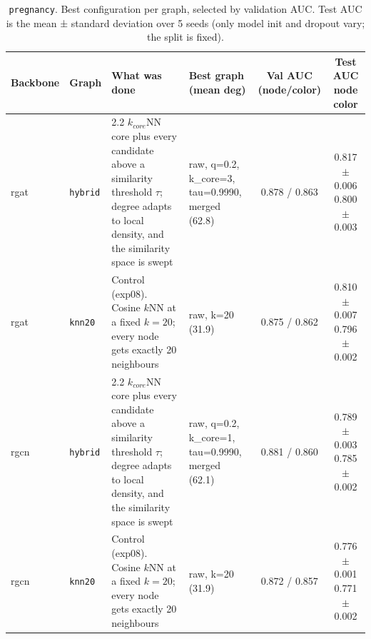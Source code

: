 \begin{table}[t]
\centering
\small
\begin{tabularx}{\textwidth}{llXlcc}
\toprule
Backbone & Graph & What was done & \makecell{Best graph\\(mean deg)} & \makecell{Val AUC\\(node/color)} & \makecell{Test AUC\\node\\color} \\
\midrule
rgat & \texttt{hybrid} & 2.2 $k_{core}$NN core plus every candidate above a similarity threshold $\tau$; degree adapts to local density, and the similarity space is swept & raw, q=0.2, k\_core=3, tau=0.9990, merged (62.8) & 0.878 / 0.863 & \makecell{0.817 $\pm$ 0.006\\0.800 $\pm$ 0.003} \\
rgat & \texttt{knn20} & Control (exp08). Cosine $k$NN at a fixed $k=20$; every node gets exactly 20 neighbours & raw, k=20 (31.9) & 0.875 / 0.862 & \makecell{0.810 $\pm$ 0.007\\0.796 $\pm$ 0.002} \\
rgcn & \texttt{hybrid} & 2.2 $k_{core}$NN core plus every candidate above a similarity threshold $\tau$; degree adapts to local density, and the similarity space is swept & raw, q=0.2, k\_core=1, tau=0.9990, merged (62.1) & 0.881 / 0.860 & \makecell{0.789 $\pm$ 0.003\\0.785 $\pm$ 0.002} \\
rgcn & \texttt{knn20} & Control (exp08). Cosine $k$NN at a fixed $k=20$; every node gets exactly 20 neighbours & raw, k=20 (31.9) & 0.872 / 0.857 & \makecell{0.776 $\pm$ 0.001\\0.771 $\pm$ 0.002} \\
\bottomrule
\end{tabularx}
\caption{\texttt{pregnancy}. Best configuration per graph, selected by validation AUC. Test AUC is the mean ± standard deviation over 5 seeds (only model init and dropout vary; the split is fixed).}
\label{tab:exp10-graph}
\end{table}
